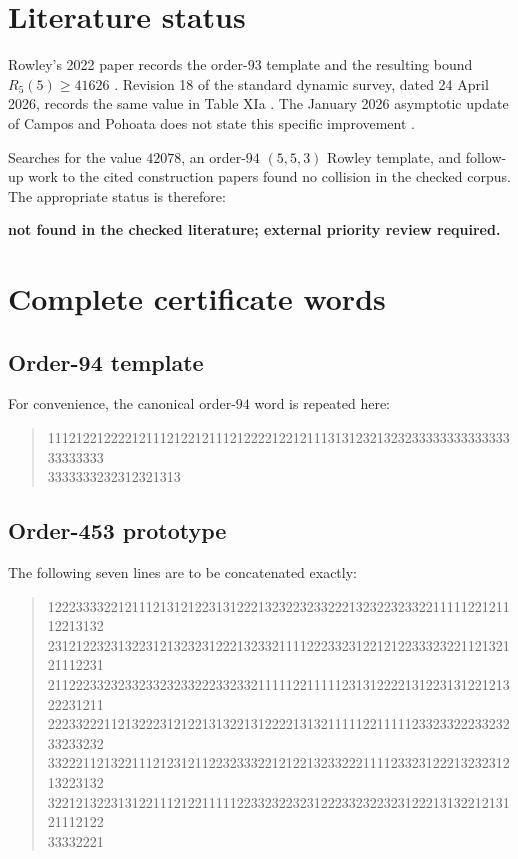 \documentclass[11pt]{article}
\theoremstyle{definition}
\theoremstyle{remark}
\begin{document}
\section{Literature status}

Rowley's 2022 paper records the order-$93$ template and the resulting bound
$R_5(5)\ge41626$ \cite{rowley-sat}.  Revision 18 of the standard dynamic
survey, dated 24 April 2026, records the same value in Table XIa
\cite{radziszowski}.  The January 2026 asymptotic update of Campos and
Pohoata does not state this specific improvement \cite{campos-pohoata}.

Searches for the value $42078$, an order-$94$ $(5,5,3)$ Rowley template,
and follow-up work to the cited construction papers found no collision in
the checked corpus.  The appropriate status is therefore:
\begin{center}
\textbf{not found in the checked literature; external priority review
required.}
\end{center}

\appendix

\section{Complete certificate words}
\label{app:words}

\subsection{Order-94 template}

For convenience, the canonical order-$94$ word is repeated here:
\begin{quote}
\ttfamily\footnotesize
11121221222212111212212111212222122121113131232132323333333333333333333333\\
3333333232312321313
\end{quote}

\subsection{Order-453 prototype}

The following seven lines are to be concatenated exactly:
\begin{quote}
\ttfamily\scriptsize
12223333221211121312122313122213232232332221323223233221111122121112213132\\
23121223231322312132323122213233211112223323122121223332322112132121112231\\
21122233232332332323322233233211111221111123131222213122313122121322231211\\
22233222112132223121221313221312222131321111122111112332332223323233233232\\
33222112132211121231211223233322121221323322211112332312221323231213223132\\
32212132231312211121221111122332322323122233232232312221313221213121112122\\
33332221
\end{quote}
\end{document}
